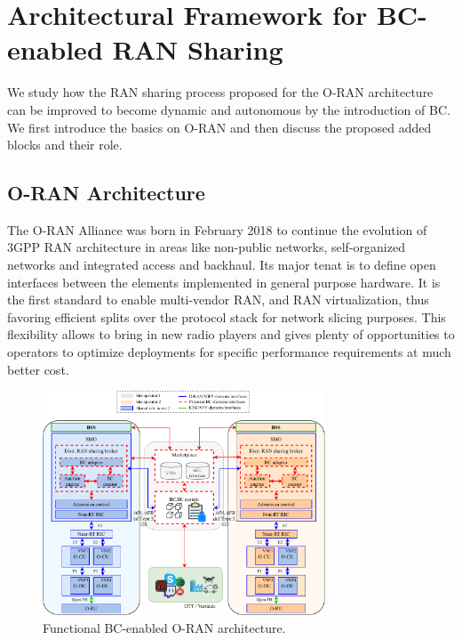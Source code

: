 \documentclass[journal]{IEEEtran}
\begin{document}
\section{Architectural Framework for BC-enabled RAN Sharing}
\label{section:architecture}
We study how the RAN sharing process proposed for the O-RAN architecture can be improved to become dynamic and autonomous by the introduction of BC. We first introduce the basics on O-RAN and then discuss the proposed added blocks and their role.

\subsection{O-RAN Architecture}
The O-RAN Alliance was born in February 2018 to continue the evolution of 3GPP RAN architecture in areas like non-public networks, self-organized networks and integrated access and backhaul.
Its major tenat is to define open interfaces between the elements implemented in general purpose hardware. It is the first standard to enable multi-vendor RAN, and RAN virtualization, thus favoring efficient splits over the protocol stack for network slicing purposes. This flexibility allows to bring in new radio players and gives plenty of opportunities to operators to optimize deployments for specific performance requirements at much better cost. 

\begin{figure}[ht!]
\centering
\includegraphics[width=0.75\textwidth]{functionalarchitecture2.pdf}
\caption{Functional BC-enabled O-RAN architecture.}
\label{fig:functionalarchitecture}
\end{figure}
\end{document}
